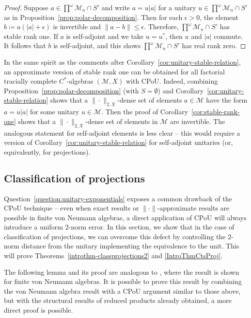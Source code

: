 \documentclass[a4paper,11pt]{amsart}
\theoremstyle{definition}
\numberwithin{equation}{section}
\numberwithin{theorem}{section}
\newcommand{\M}{\mathcal{M}}
\begin{document}
\begin{proof}
	Suppose $a \in \prod^\omega\M_n \cap S'$ and write $a = u|a|$ for a unitary $u \in \prod^\omega\M_n \cap S'$ as in Proposition~\ref{prop:polar-decomposition}.  Then for each $\epsilon > 0$, the element $b \coloneqq u(|a|+\epsilon)$ is invertible and $\|a - b\| \leq \epsilon$.  Therefore, $\prod^\omega\M_n \cap S'$ has stable rank one.  If $a$ is self-adjoint and we take $u = u^*$, then $u$ and $|a|$ commute.  It follows that $b$ is self-adjoint, and this shows $\prod^\omega\M_n \cap S'$ has real rank zero.
\end{proof}

In the same spirit as the comments after Corollary~\ref{cor:unitary-stable-relation}, an approximate version of stable rank one can be obtained for all factorial tracially complete $C^*$-algebras $(\M, X)$ with CPoU.  Indeed, combining Proposition~\ref{prop:polar-decomposition} (with $S = \emptyset$) and Corollary~\ref{cor:unitary-stable-relation} shows that a $\|\cdot\|_{2, X}$-dense set of elements $a \in \M$ have the form $a = u|a|$ for some unitary $u \in \M$.  Then the proof of Corollary~\ref{cor:stable-rank-one} shows that a $\|\cdot\|_{2, X}$-dense set of elements in $\M$ are invertible.  The analogous statement for self-adjoint elements is less clear -- this would require a version of Corollary~\ref{cor:unitary-stable-relation} for self-adjoint unitaries (or, equivalently, for projections).


	


\subsection{Classification of projections}\label{sec:app-CPoU-projections}


Question~\ref{question:unitary-exponentials} exposes a common drawback of the CPoU technique -- even when exact results or $\|\cdot\|$-approximate results are possible in finite von Neumann algebras, a direct application of CPoU will always introduce a uniform 2-norm error.  In this section, we show that in the case of classification of projections, we can overcome this defect by controlling the 2-norm distance from the unitary implementing the equivalence to the unit. This will prove Theorems~\ref{introthm-classprojections2} and \ref{IntroThmCtsProj}.

The following lemma and its proof are analogous to \cite[Lemma~XIV.2.1]{Tak03}, where the result is shown for finite von Neumann algebras.  It is possible to prove this result by combining the von Neumann algebra result with a CPoU argument similar to those above, but with the structural results of reduced products already obtained, a more direct proof is possible.
\end{document}
